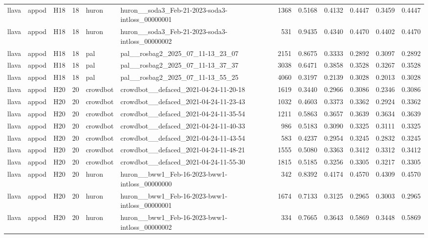 \begin{table}[tbp]
\begin{tabular}{lllrllrrrrrr}
llava & appod & H18 & 18 & huron & huron\_\_soda3\_Feb-21-2023-soda3-intloss\_00000001 & 1368 & 0.5168 & 0.4132 & 0.4447 & 0.3459 & 0.4447 \\
llava & appod & H18 & 18 & huron & huron\_\_soda3\_Feb-21-2023-soda3-intloss\_00000002 & 531 & 0.9435 & 0.4340 & 0.4470 & 0.4402 & 0.4470 \\
llava & appod & H18 & 18 & pal & pal\_\_rosbag2\_2025\_07\_11-13\_23\_07 & 2151 & 0.8675 & 0.3333 & 0.2892 & 0.3097 & 0.2892 \\
llava & appod & H18 & 18 & pal & pal\_\_rosbag2\_2025\_07\_11-13\_37\_37 & 3038 & 0.6471 & 0.3858 & 0.3528 & 0.3267 & 0.3528 \\
llava & appod & H18 & 18 & pal & pal\_\_rosbag2\_2025\_07\_11-13\_55\_25 & 4060 & 0.3197 & 0.2139 & 0.3028 & 0.2013 & 0.3028 \\
llava & appod & H20 & 20 & crowdbot & crowdbot\_\_defaced\_2021-04-24-11-20-18 & 1619 & 0.3440 & 0.2966 & 0.3086 & 0.2346 & 0.3086 \\
llava & appod & H20 & 20 & crowdbot & crowdbot\_\_defaced\_2021-04-24-11-23-43 & 1032 & 0.4603 & 0.3373 & 0.3362 & 0.2924 & 0.3362 \\
llava & appod & H20 & 20 & crowdbot & crowdbot\_\_defaced\_2021-04-24-11-35-54 & 1211 & 0.5863 & 0.3657 & 0.3639 & 0.3634 & 0.3639 \\
llava & appod & H20 & 20 & crowdbot & crowdbot\_\_defaced\_2021-04-24-11-40-33 & 986 & 0.5183 & 0.3090 & 0.3325 & 0.3111 & 0.3325 \\
llava & appod & H20 & 20 & crowdbot & crowdbot\_\_defaced\_2021-04-24-11-43-54 & 583 & 0.4237 & 0.2954 & 0.3245 & 0.2832 & 0.3245 \\
llava & appod & H20 & 20 & crowdbot & crowdbot\_\_defaced\_2021-04-24-11-48-21 & 1555 & 0.5080 & 0.3363 & 0.3412 & 0.3312 & 0.3412 \\
llava & appod & H20 & 20 & crowdbot & crowdbot\_\_defaced\_2021-04-24-11-55-30 & 1815 & 0.5185 & 0.3256 & 0.3305 & 0.3217 & 0.3305 \\
llava & appod & H20 & 20 & huron & huron\_\_bww1\_Feb-16-2023-bww1-intloss\_00000000 & 342 & 0.8392 & 0.4174 & 0.4570 & 0.4309 & 0.4570 \\
llava & appod & H20 & 20 & huron & huron\_\_bww1\_Feb-16-2023-bww1-intloss\_00000001 & 1674 & 0.7133 & 0.3125 & 0.2965 & 0.3003 & 0.2965 \\
llava & appod & H20 & 20 & huron & huron\_\_bww1\_Feb-16-2023-bww1-intloss\_00000002 & 334 & 0.7665 & 0.3643 & 0.5869 & 0.3448 & 0.5869 \\

\end{tabular}
\end{table}
